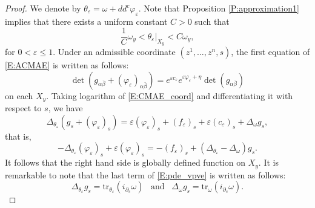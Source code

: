 \documentclass{amsart}
\theoremstyle{definition}
\numberwithin{equation}{section}
\begin{document}
\begin{proof}
We denote by $\theta_{\varepsilon}=\omega+dd^c{\varphi}_{\varepsilon}$. Note that Proposition \ref{P:approximation1} implies that there exists a uniform constant $C>0$ such that
\begin{equation}\label{E:equivalence}
\frac{1}{C}\omega_y
<
\theta_{\varepsilon}\vert_{X_y}
<
C\omega_y,
\end{equation}
for $0<{\varepsilon}\le1$. Under an admissible coordinate $(z^1,\dots,z^n,s)$, the first equation of \eqref{E:ACMAE} is written as follows:
\begin{equation} \label{E:CMAE_coord}
\det(g_{\alpha\bar\beta}+(\varphi_{\varepsilon})_{\alpha\bar\beta})
=
e^{\varepsilon c_\varepsilon}e^{\varepsilon\varphi_{\varepsilon}+\eta}
\det(g_{\alpha\bar\beta})
\end{equation}
on each $X_y$. Taking logarithm of \eqref{E:CMAE_coord} and differentiating it with respect to $s$, we have
\begin{equation*}
\Delta_{\theta_{\varepsilon}}{\left({g_s+({\varphi}_{\varepsilon})_s}\right)}
=
{\varepsilon}({\varphi}_{\varepsilon})_s
+
(f_{\varepsilon})_s+{\varepsilon}(c_{\varepsilon})_s
+
\Delta_\omega g_s,
\end{equation*}
that is,
\begin{equation}\label{E:pde_vpve}
-\Delta_{\theta_{\varepsilon}}({\varphi}_{\varepsilon})_s
+
{\varepsilon}({\varphi}_{\varepsilon})_s
=
-(f_{\varepsilon})_s
+
(\Delta_{\theta_{\varepsilon}}-\Delta_\omega){g}_s.
\end{equation}
It follows that the right hand side is globally defined function on $X_y$. It is remarkable to note that the last term of \eqref{E:pde_vpve} is written as follows:
\begin{equation*}
\Delta_{\theta_{\varepsilon}}{g}_s
=
\mathrm{tr}_{\theta_{\varepsilon}}
{\left({
	i_{\partial_s}\omega
	}\right)}
\;\;\;\text{and}\;\;\;
\Delta_\omega g_s
=
\mathrm{tr}_{\omega}
	{\left({i_{\partial_s}\omega
	}\right)}.
\end{equation*}


\end{proof}
\end{document}
